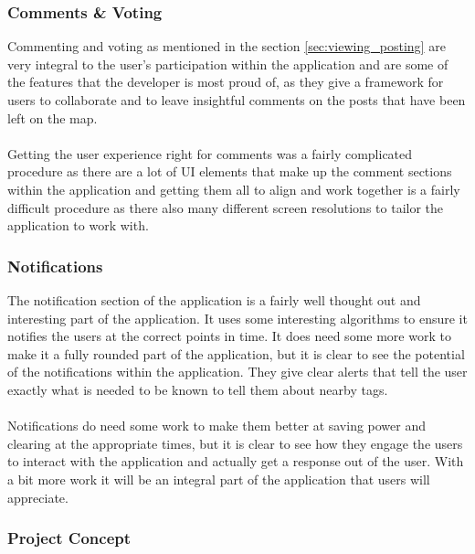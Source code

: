 \subsubsection{Comments \& Voting}

Commenting and voting as mentioned in the section \ref{sec:viewing_posting} are very integral to the user's participation within the application and are some of the features that the developer is most proud of, as they give a framework for users to collaborate and to leave insightful comments on the posts that have been left on the map.\\
\\
Getting the user experience right for comments was a fairly complicated procedure as there are a lot of UI elements that make up the comment sections within the application and getting them all to align and work together is a fairly difficult procedure as there also many different screen resolutions to tailor the application to work with.

\subsubsection{Notifications}

The notification section of the application is a fairly well thought out and interesting part of the application. It uses some interesting algorithms to ensure it notifies the users at the correct points in time. It does need some more work to make it a fully rounded part of the application, but it is clear to see the potential of the notifications within the application. They give clear alerts that tell the user exactly what is needed to be known to tell them about nearby tags.\\
\\
Notifications do need some work to make them better at saving power and clearing at the appropriate times, but it is clear to see how they engage the users to interact with the application and actually get a response out of the user. With a bit more work it will be an integral part of the application that users will appreciate.

\subsubsection{Project Concept}

